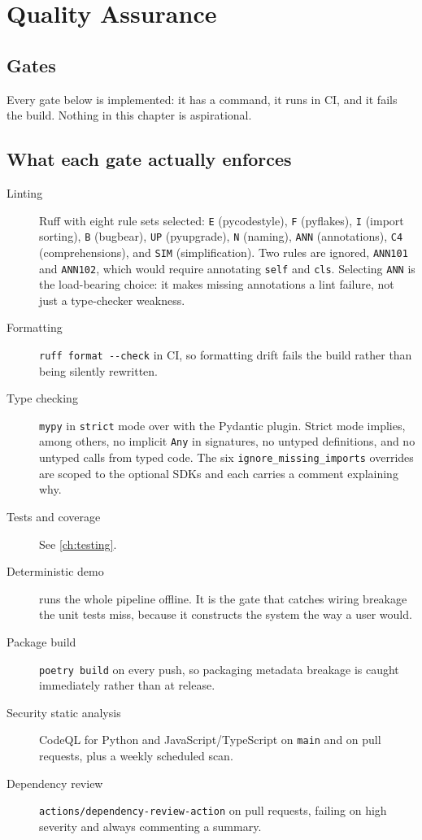 
\chapter{Quality Assurance}
\label{ch:quality-assurance}

\section{Gates}

Every gate below is implemented: it has a command, it runs in CI, and it fails
the build. Nothing in this chapter is aspirational.



\section{What each gate actually enforces}

\begin{description}
  \item[Linting] Ruff with eight rule sets selected: \texttt{E} (pycodestyle),
    \texttt{F} (pyflakes), \texttt{I} (import sorting), \texttt{B}
    (bugbear), \texttt{UP} (pyupgrade), \texttt{N} (naming), \texttt{ANN}
    (annotations), \texttt{C4} (comprehensions), and \texttt{SIM}
    (simplification). Two rules are ignored, \texttt{ANN101} and
    \texttt{ANN102}, which would require annotating \texttt{self} and
    \texttt{cls}. Selecting \texttt{ANN} is the load-bearing choice: it makes
    missing annotations a lint failure, not just a type-checker weakness.
  \item[Formatting] \texttt{ruff format -{}-check} in CI, so formatting drift
    fails the build rather than being silently rewritten.
  \item[Type checking] \texttt{mypy} in \texttt{strict} mode over
     with the Pydantic plugin. Strict mode implies, among
    others, no implicit \texttt{Any} in signatures, no untyped definitions, and
    no untyped calls from typed code. The six \texttt{ignore\_missing\_imports}
    overrides are scoped to the optional SDKs and each carries a comment
    explaining why.
  \item[Tests and coverage] See \cref{ch:testing}.
  \item[Deterministic demo]  runs the whole
    pipeline offline. It is the gate that catches wiring breakage the unit
    tests miss, because it constructs the system the way a user would.
  \item[Package build] \texttt{poetry build} on every push, so packaging
    metadata breakage is caught immediately rather than at release.
  \item[Security static analysis] CodeQL for Python and JavaScript/TypeScript
    on \texttt{main} and on pull requests, plus a weekly scheduled scan.
  \item[Dependency review] \texttt{actions/dependency-review-action} on pull
    requests, failing on high severity and always commenting a summary.
\end{description}

